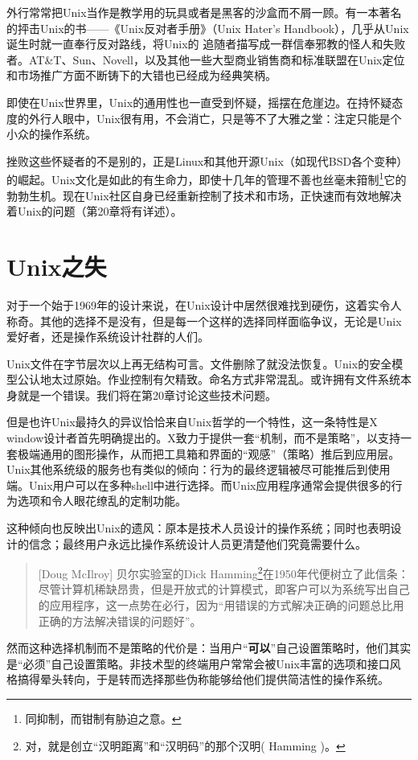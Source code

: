 \documentclass[12pt,oneside]{book}
\begin{document}
\begin{common-format}
外行常常把Unix当作是教学用的玩具或者是黑客的沙盒而不屑一顾。有一本著名的抨击Unix的书——《Unix反对者手册》（Unix Hater's Handbook）\cite{Garfinkel}，几乎从Unix诞生时就一直奉行反对路线，将Unix的 追随者描写成一群信奉邪教的怪人和失败者。AT\&{}T、Sun、Novell，以及其他一些大型商业销售商和标准联盟在Unix定位和市场推广方面不断铸下的大错也已经成为经典笑柄。

即使在Unix世界里，Unix的通用性也一直受到怀疑，摇摆在危崖边。在持怀疑态度的外行人眼中，Unix很有用，不会消亡，只是等不了大雅之堂：注定只能是个小众的操作系统。

挫败这些怀疑者的不是别的，正是Linux和其他开源Unix（如现代BSD各个变种）的崛起。Unix文化是如此的有生命力，即使十几年的管理不善也丝毫未箝制\footnote{同抑制，而钳制有胁迫之意。}它的勃勃生机。现在Unix社区自身已经重新控制了技术和市场，正快速而有效地解决着Unix的问题（第20章将有详述）。


\section{Unix之失}
对于一个始于1969年的设计来说，在Unix设计中居然很难找到硬伤，这着实令人称奇。其他的选择不是没有，但是每一个这样的选择同样面临争议，无论是Unix爱好者，还是操作系统设计社群的人们。

Unix文件在字节层次以上再无结构可言。文件删除了就没法恢复。Unix的安全模型公认地太过原始。作业控制有欠精致。命名方式非常混乱。或许拥有文件系统本身就是一个错误。我们将在第20章讨论这些技术问题。

但是也许Unix最持久的异议恰恰来自Unix哲学的一个特性，这一条特性是X window设计者首先明确提出的。X致力于提供一套“机制，而不是策略”，以支持一套极端通用的图形操作，从而把工具箱和界面的“观感”（策略）推后到应用层。Unix其他系统级的服务也有类似的倾向：行为的最终逻辑被尽可能推后到使用端。Unix用户可以在多种shell中进行选择。而Unix应用程序通常会提供很多的行为选项和令人眼花缭乱的定制功能。

这种倾向也反映出Unix的遗风：原本是技术人员设计的操作系统；同时也表明设计的信念；最终用户永远比操作系统设计人员更清楚他们究竟需要什么。

\begin{quote}[Doug McIlroy]
贝尔实验室的Dick Hamming\footnote{对，就是创立“汉明距离”和“汉明码”的那个汉明( Hamming )。}在1950年代便树立了此信条：尽管计算机稀缺昂贵，但是开放式的计算模式，即客户可以为系统写出自己的应用程序，这一点势在必行，因为“用错误的方式解决正确的问题总比用正确的方法解决错误的问题好”。
\end{quote}

然而这种选择机制而不是策略的代价是：当用户“\textbf{可以}”自己设置策略时，他们其实是“必须”自己设置策略。非技术型的终端用户常常会被Unix丰富的选项和接口风格搞得晕头转向，于是转而选择那些伪称能够给他们提供简洁性的操作系统。


\end{common-format}
\end{document}
